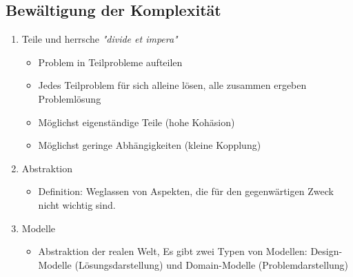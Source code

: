 \subsection{Bewältigung der Komplexität}	
		\begin{enumerate}
			\item Teile und herrsche \textit{"divide et impera"}
					\begin{itemize}
						\item Problem in Teilprobleme aufteilen
						\item Jedes Teilproblem für sich alleine lösen, alle zusammen ergeben Problemlösung
						\item Möglichst eigenständige Teile (hohe Kohäsion)
						\item Möglichst geringe Abhängigkeiten (kleine Kopplung)
					\end{itemize}
			\item Abstraktion
					\begin{itemize}
						\item Definition: Weglassen von Aspekten, die für den gegenwärtigen Zweck nicht wichtig sind.
					\end{itemize}
			\item Modelle
					\begin{itemize}
						\item Abstraktion der realen Welt, Es gibt zwei Typen von Modellen: Design-Modelle (Lösungsdarstellung) und Domain-Modelle (Problemdarstellung)
					\end{itemize}
		\end{enumerate}

